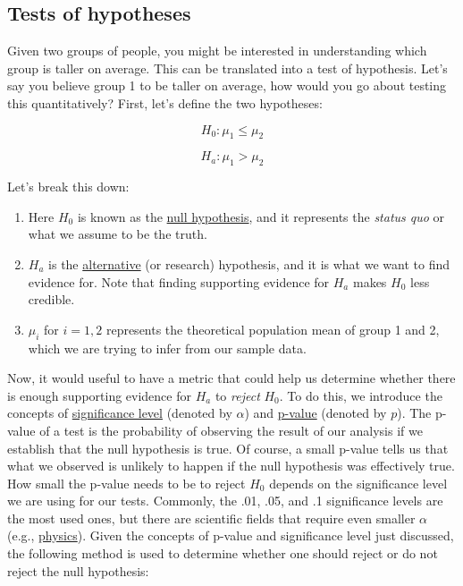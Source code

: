 \documentclass[
  letterpaper,
  DIV=11,
  numbers=noendperiod]{scrartcl}
\providecommand{\tightlist}{%
  \setlength{\itemsep}{0pt}\setlength{\parskip}{0pt}}\usepackage{longtable,booktabs,array}
\begin{document}
\subsection{Tests of hypotheses}\label{sec-testhyp}

Given two groups of people, you might be interested in understanding
which group is taller on average. This can be translated into a test of
hypothesis. Let's say you believe group 1 to be taller on average, how
would you go about testing this quantitatively? First, let's define the
two hypotheses:

\[
H_0: \mu_1 \leq \mu_2
\]

\[
H_a: \mu_1 > \mu_2
\]

Let's break this down:

\begin{enumerate}
\def\labelenumi{\arabic{enumi}.}
\tightlist
\item
  Here \(H_0\) is known as the
  \href{https://en.wikipedia.org/wiki/Null_hypothesis}{null hypothesis},
  and it represents the \emph{status quo} or what we assume to be the
  truth.
\item
  \(H_a\) is the
  \href{https://en.wikipedia.org/wiki/Alternative_hypothesis}{alternative}
  (or research) hypothesis, and it is what we want to find evidence for.
  Note that finding supporting evidence for \(H_a\) makes \(H_0\) less
  credible.
\item
  \(\mu_i\) for \(i = {1,2}\) represents the theoretical population mean
  of group 1 and 2, which we are trying to infer from our sample data.
\end{enumerate}

Now, it would useful to have a metric that could help us determine
whether there is enough supporting evidence for \(H_a\) to \emph{reject}
\(H_0\). To do this, we introduce the concepts of
\href{https://en.wikipedia.org/wiki/Statistical_significance}{significance
level} (denoted by \(\alpha\)) and
\href{https://www.scribbr.com/statistics/p-value/\#:~:text=A\%20p\%2Dvalue\%2C\%20or\%20probability,to\%20perform\%20your\%20statistical\%20test.}{p-value}
(denoted by \(p\)). The p-value of a test is the probability of
observing the result of our analysis if we establish that the null
hypothesis is true. Of course, a small p-value tells us that what we
observed is unlikely to happen if the null hypothesis was effectively
true. How small the p-value needs to be to reject \(H_0\) depends on the
significance level we are using for our tests. Commonly, the .01, .05,
and .1 significance levels are the most used ones, but there are
scientific fields that require even smaller \(\alpha\) (e.g.,
\href{https://home.cern/resources/faqs/five-sigma}{physics}). Given the
concepts of p-value and significance level just discussed, the following
method is used to determine whether one should reject or do not reject
the null hypothesis:
\end{document}
